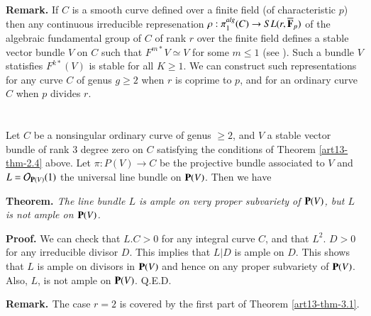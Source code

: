 \medskip
\noindent
{\bfseries Remark.} If $C$ is a smooth curve defined over a finite field (of characteristic $p$) then any continuous irreducible represenation $\rho : \pi_{1}^{alg}(C)\rightarrow SL(r, \overline{\mathbf{F}}_{p})$ of the algebraic fundamental group of $C$ of rank $r$ over the finite field defines a stable vector bundle $V$ on $C$ such that $F^{m*}V \simeq V$ for some $m \leq 1$ (see \cite{art13-key4}). Such a bundle $V$ statisfies $F^{k*}(V)$ is stable for all $K \geq 1$. We can construct such representations for any curve $C$ of genus $g \geq 2$ when $r$ is coprime to $p$, and for an ordinary curve $C$ when $p$ divides $r$.


\section{}\label{art13-sec-3}
Let $C$ be a nonsingular ordinary curve of genus $\geq 2$, and $V$ a stable vector bundle of rank 3 degree zero on $C$ satisfying the conditions of Theorem \eqref{art13-thm-2.4} above. Let $\pi : P(V)\rightarrow C$ be the projective bundle associated to $V$ and $L=\mathcal{O}_{\mathbf{P} (V)}(1)$ the universal line bundle on $\mathbf{P}(V)$. Then we have 

\medskip
\noindent
{\bfseries {} Theorem. \label{art13-thm-3.1}} \textit{The line bundle $L$ is ample on very proper subvariety of $\mathbf{P}(V)$, but $L$ is not ample on $\mathbf{P}(V)$.}

\medskip
\noindent
{\bfseries Proof.} We can check that $L.C > 0$ for any integral curve $C$, and that $L^{2}$. $D >0$ for any irreducible divisor $D$. This implies that $L | D$ is ample on $D$. This shows that $L$ is ample on divisors in $\mathbf{P}(V)$ and hence on any proper subvariety of $\mathbf{P}(V)$. Also, $L$, is not ample on $\mathbf{P}(V)$. \hfill Q.E.D. 

\medskip
\noindent
{\bfseries {} Remark. \label{art13-thm-3.2}} The case $r=2$ is covered by the first part of Theorem
\eqref{art13-thm-3.1}.

